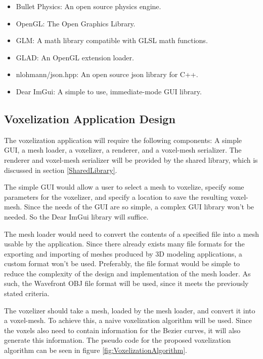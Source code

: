 \begin{itemize}
  \item Bullet Physics: An open source physics engine.
  \item OpenGL: The Open Graphics Library.
  \item GLM: A math library compatible with GLSL math functions.
  \item GLAD: An OpenGL extension loader.
  \item nlohmann/json.hpp: An open source json library for C++.
  \item Dear ImGui: A simple to use, immediate-mode GUI library.
\end{itemize}

\subsection{Voxelization Application Design}

The voxelization application will require the following components: A simple GUI, a mesh loader,
a voxelizer, a renderer, and a voxel-mesh serializer. The renderer and voxel-mesh serializer will 
be provided by the shared library, which is discussed in section \ref{SharedLibrary}. 

The simple GUI would allow a user to select a mesh to voxelize, specify some parameters for the 
voxelizer, and specify a location to save the resulting voxel-mesh. Since the needs of the GUI are 
so simple, a complex GUI library won't be needed. So the Dear ImGui library will suffice.

The mesh loader would need to convert the contents of a specified file into a mesh usable by the
application. Since there already exists many file formats for the exporting and importing of meshes
produced by 3D modeling applications, a custom format won't be used. Preferably, the file format 
would be simple to reduce the complexity of the design and implementation of the mesh loader. As
such, the Wavefront OBJ file format will be used, since it meets the previously stated criteria.

The voxelizer should take a mesh, loaded by the mesh loader, and convert it into a voxel-mesh. To
achieve this, a naive voxelization algorithm will be used. Since the voxels also need to contain
information for the Bezier curves, it will also generate this information. The pseudo code for the 
proposed voxelization algorithm can be seen in figure \ref{fig:VoxelizationAlgorithm}.

